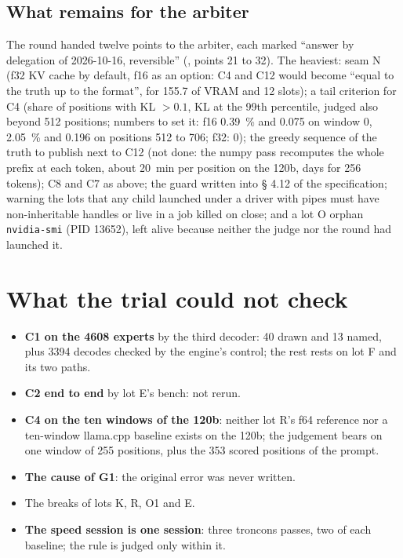 \subsection{What remains for the arbiter}\label{t2e-sec:arbitre}

The round handed twelve points to the arbiter, each marked ``answer by delegation of 2026-10-16, reversible'' (, points 21 to 32). The heaviest: seam N (f32 KV cache by default, f16 as an option: C4 and C12 would become ``equal to the truth up to the format'', for \SI{155.7}{\Mo} of VRAM and 12 slots); a tail criterion for C4 (share of positions with KL $> 0.1$, KL at the 99th percentile, judged also beyond 512 positions; numbers to set it: f16 \SI{0.39}{\percent} and \num{0.075} on window 0, \SI{2.05}{\percent} and \num{0.196} on positions 512 to 706; f32: 0); the greedy sequence of the truth to publish next to C12 (not done: the numpy pass recomputes the whole prefix at each token, about \SI{20}{\minute} per position on the 120b, days for 256 tokens); C8 and C7 as above; the guard written into § 4.12 of the specification; warning the lots that any child launched under a driver with pipes must have non-inheritable handles or live in a job killed on close; and a lot O orphan \texttt{nvidia-smi} (PID 13652), left alive because neither the judge nor the round had launched it.

\section{What the trial could not check}\label{t2e-sec:non-verifie}

\begin{itemize}
\item \textbf{C1 on the \num{4608} experts} by the third decoder: 40 drawn and 13 named, plus \num{3394} decodes checked by the engine's control; the rest rests on lot F and its two paths.
\item \textbf{C2 end to end} by lot E's bench: not rerun.
\item \textbf{C4 on the ten windows of the 120b}: neither lot R's f64 reference nor a ten-window llama.cpp baseline exists on the 120b; the judgement bears on one window of 255 positions, plus the 353 scored positions of the prompt.
\item \textbf{The cause of G1}: the original error was never written.
\item The breaks of lots K, R, O1 and E.
\item \textbf{The speed session is one session}: three troncons passes, two of each baseline; the rule is judged only within it.
\end{itemize}

